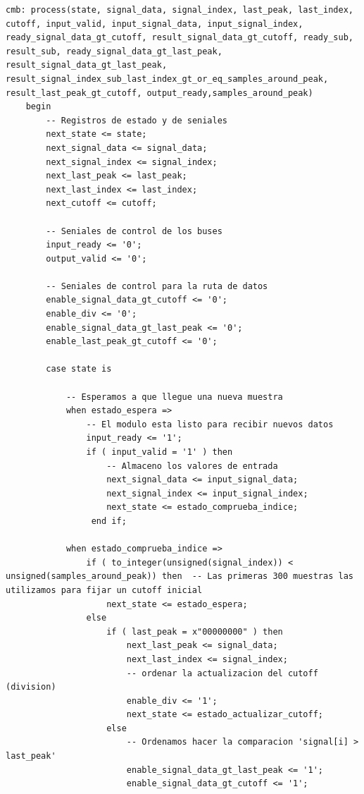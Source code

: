 \begin{lstlisting}[frame=single]
    cmb: process(state, signal_data, signal_index, last_peak, last_index, cutoff, input_valid, input_signal_data, input_signal_index, ready_signal_data_gt_cutoff, result_signal_data_gt_cutoff, ready_sub, result_sub, ready_signal_data_gt_last_peak, result_signal_data_gt_last_peak, result_signal_index_sub_last_index_gt_or_eq_samples_around_peak, result_last_peak_gt_cutoff, output_ready,samples_around_peak)
    begin
        -- Registros de estado y de seniales
        next_state <= state;
        next_signal_data <= signal_data;
        next_signal_index <= signal_index;
        next_last_peak <= last_peak;
        next_last_index <= last_index;
        next_cutoff <= cutoff;
        
        -- Seniales de control de los buses
        input_ready <= '0';
        output_valid <= '0';
        
        -- Seniales de control para la ruta de datos
        enable_signal_data_gt_cutoff <= '0';
        enable_div <= '0';
        enable_signal_data_gt_last_peak <= '0';
        enable_last_peak_gt_cutoff <= '0';
    
        case state is 
        
            -- Esperamos a que llegue una nueva muestra
            when estado_espera =>
                -- El modulo esta listo para recibir nuevos datos
                input_ready <= '1';
                if ( input_valid = '1' ) then
                    -- Almaceno los valores de entrada
                    next_signal_data <= input_signal_data;
                    next_signal_index <= input_signal_index;
                    next_state <= estado_comprueba_indice;
                 end if;
                 
            when estado_comprueba_indice =>
                if ( to_integer(unsigned(signal_index)) < unsigned(samples_around_peak)) then  -- Las primeras 300 muestras las utilizamos para fijar un cutoff inicial
                    next_state <= estado_espera;
                else
                    if ( last_peak = x"00000000" ) then
                        next_last_peak <= signal_data;
                        next_last_index <= signal_index;
                        -- ordenar la actualizacion del cutoff (division)
                        enable_div <= '1';
                        next_state <= estado_actualizar_cutoff;
                    else
                        -- Ordenamos hacer la comparacion 'signal[i] > last_peak'
                        enable_signal_data_gt_last_peak <= '1';
                        enable_signal_data_gt_cutoff <= '1';
                        

\end{lstlisting}
